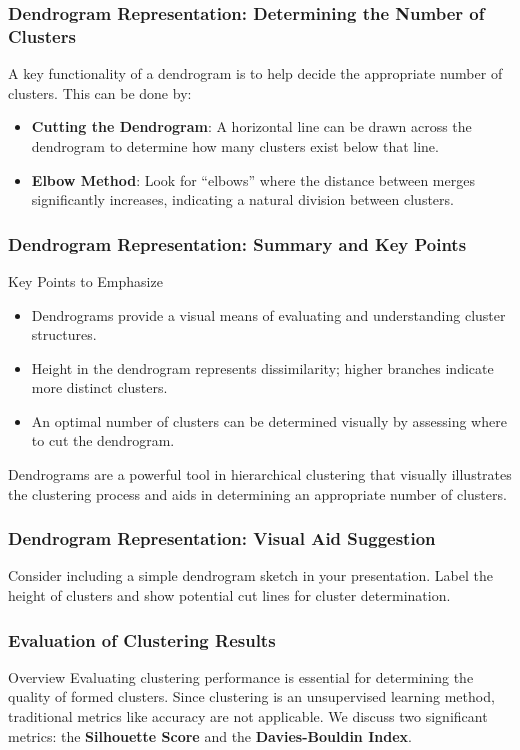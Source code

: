 \documentclass{beamer}
\begin{document}
\begin{frame}[fragile]
    \frametitle{Dendrogram Representation: Determining the Number of Clusters}
    A key functionality of a dendrogram is to help decide the appropriate number of clusters. This can be done by:
    \begin{itemize}
        \item \textbf{Cutting the Dendrogram}: A horizontal line can be drawn across the dendrogram to determine how many clusters exist below that line.
        \item \textbf{Elbow Method}: Look for “elbows” where the distance between merges significantly increases, indicating a natural division between clusters.
    \end{itemize}
\end{frame}

\begin{frame}[fragile]
    \frametitle{Dendrogram Representation: Summary and Key Points}
    \begin{block}{Key Points to Emphasize}
        \begin{itemize}
            \item Dendrograms provide a visual means of evaluating and understanding cluster structures.
            \item Height in the dendrogram represents dissimilarity; higher branches indicate more distinct clusters.
            \item An optimal number of clusters can be determined visually by assessing where to cut the dendrogram.
        \end{itemize}
    \end{block}

    Dendrograms are a powerful tool in hierarchical clustering that visually illustrates the clustering process and aids in determining an appropriate number of clusters.
\end{frame}

\begin{frame}[fragile]
    \frametitle{Dendrogram Representation: Visual Aid Suggestion}
    Consider including a simple dendrogram sketch in your presentation. Label the height of clusters and show potential cut lines for cluster determination.
\end{frame}

\begin{frame}[fragile]
    \frametitle{Evaluation of Clustering Results}
    \begin{block}{Overview}
        Evaluating clustering performance is essential for determining the quality of formed clusters. Since clustering is an unsupervised learning method, traditional metrics like accuracy are not applicable. We discuss two significant metrics: the \textbf{Silhouette Score} and the \textbf{Davies-Bouldin Index}.
    \end{block}
\end{frame}
\end{document}

